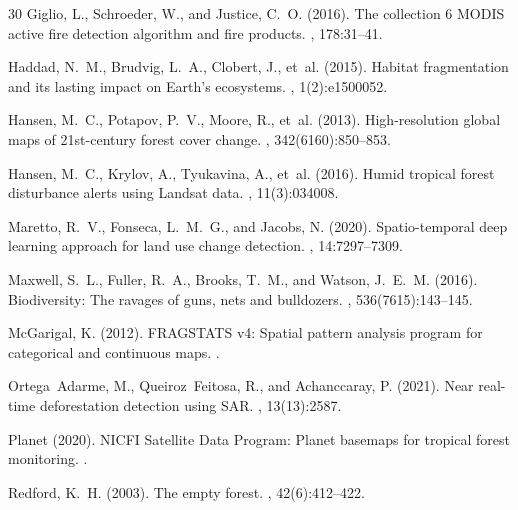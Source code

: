 \begin{thebibliography}{30}
Giglio, L., Schroeder, W., and Justice, C.~O. (2016).
\newblock The collection 6 MODIS active fire detection algorithm and fire products.
, 178:31--41.

Haddad, N.~M., Brudvig, L.~A., Clobert, J., et~al. (2015).
\newblock Habitat fragmentation and its lasting impact on Earth's ecosystems.
, 1(2):e1500052.

Hansen, M.~C., Potapov, P.~V., Moore, R., et~al. (2013).
\newblock High-resolution global maps of 21st-century forest cover change.
, 342(6160):850--853.

Hansen, M.~C., Krylov, A., Tyukavina, A., et~al. (2016).
\newblock Humid tropical forest disturbance alerts using Landsat data.
, 11(3):034008.

Maretto, R.~V., Fonseca, L.~M.~G., and Jacobs, N. (2020).
\newblock Spatio-temporal deep learning approach for land use change detection.
, 14:7297--7309.

Maxwell, S.~L., Fuller, R.~A., Brooks, T.~M., and Watson, J.~E.~M. (2016).
\newblock Biodiversity: The ravages of guns, nets and bulldozers.
, 536(7615):143--145.

McGarigal, K. (2012).
\newblock FRAGSTATS v4: Spatial pattern analysis program for categorical and continuous maps.
.

Ortega~Adarme, M., Queiroz~Feitosa, R., and Achanccaray, P. (2021).
\newblock Near real-time deforestation detection using SAR.
, 13(13):2587.

Planet (2020).
\newblock NICFI Satellite Data Program: Planet basemaps for tropical forest monitoring.
.

Redford, K.~H. (2003).
\newblock The empty forest.
, 42(6):412--422.


\end{thebibliography}
